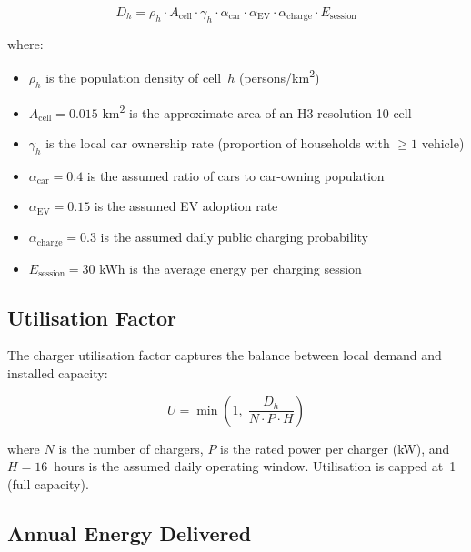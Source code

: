 \begin{equation}
\label{eq:demand}
D_h = \rho_h \cdot A_{\text{cell}} \cdot \gamma_h \cdot \alpha_{\text{car}} \cdot \alpha_{\text{EV}} \cdot \alpha_{\text{charge}} \cdot E_{\text{session}}
\end{equation}

\noindent where:
\begin{itemize}[nosep]
    \item $\rho_h$ is the population density of cell~$h$ (persons/km\textsuperscript{2})
    \item $A_{\text{cell}} = 0.015$ km\textsuperscript{2} is the approximate area of an H3 resolution-10 cell
    \item $\gamma_h$ is the local car ownership rate (proportion of households with $\geq 1$ vehicle)
    \item $\alpha_{\text{car}} = 0.4$ is the assumed ratio of cars to car-owning population
    \item $\alpha_{\text{EV}} = 0.15$ is the assumed EV adoption rate
    \item $\alpha_{\text{charge}} = 0.3$ is the assumed daily public charging probability
    \item $E_{\text{session}} = 30$ kWh is the average energy per charging session
\end{itemize}

\subsection{Utilisation Factor}
\label{sec:utilisation}

The charger utilisation factor captures the balance between local demand and installed capacity:

\begin{equation}
\label{eq:utilisation}
U = \min\!\left(1,\; \frac{D_h}{N \cdot P \cdot H}\right)
\end{equation}

\noindent where $N$ is the number of chargers, $P$ is the rated power per charger (kW), and $H = 16$~hours is the assumed daily operating window. Utilisation is capped at~1 (full capacity).

\subsection{Annual Energy Delivered}
\label{sec:energy}

